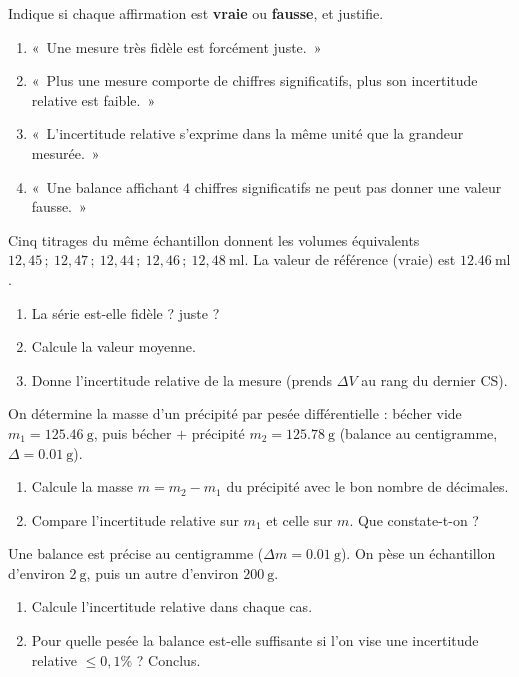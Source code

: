 \documentclass[11pt,a4paper]{article}
\begin{document}
\begin{exo}
Indique si chaque affirmation est \textbf{vraie} ou \textbf{fausse}, et justifie.
\begin{enumerate}[label=\alph*)]
  \item «~Une mesure très fidèle est forcément juste.~»
  \item «~Plus une mesure comporte de chiffres significatifs, plus son incertitude relative est faible.~»
  \item «~L'incertitude relative s'exprime dans la même unité que la grandeur mesurée.~»
  \item «~Une balance affichant $4$ chiffres significatifs ne peut pas donner une valeur fausse.~»
\end{enumerate}
\end{exo}

\begin{exo}
Cinq titrages du même échantillon donnent les volumes équivalents
$12,45\,;\ 12,47\,;\ 12,44\,;\ 12,46\,;\ 12,48\ \si{\milli\litre}$. La valeur de référence (vraie) est
$\qty{12,46}{\milli\litre}$.
\begin{enumerate}[label=\alph*)]
  \item La série est-elle fidèle ? juste ?
  \item Calcule la valeur moyenne.
  \item Donne l'incertitude relative de la mesure (prends $\Delta V$ au rang du dernier CS).
\end{enumerate}
\end{exo}

\begin{exo}
On détermine la masse d'un précipité par pesée différentielle : bécher vide $m_1=\qty{125,46}{\gram}$,
puis bécher $+$ précipité $m_2=\qty{125,78}{\gram}$ (balance au centigramme, $\Delta=\qty{0,01}{\gram}$).
\begin{enumerate}[label=\alph*)]
  \item Calcule la masse $m=m_2-m_1$ du précipité avec le bon nombre de décimales.
  \item Compare l'incertitude relative sur $m_1$ et celle sur $m$. Que constate-t-on ?
\end{enumerate}
\end{exo}

\begin{exo}
Une balance est précise au centigramme ($\Delta m=\qty{0,01}{\gram}$). On pèse un échantillon
d'environ $\qty{2}{\gram}$, puis un autre d'environ $\qty{200}{\gram}$.
\begin{enumerate}[label=\alph*)]
  \item Calcule l'incertitude relative dans chaque cas.
  \item Pour quelle pesée la balance est-elle suffisante si l'on vise une incertitude relative
        $\le 0,1\%$ ? Conclus.
\end{enumerate}
\end{exo}
\end{document}
